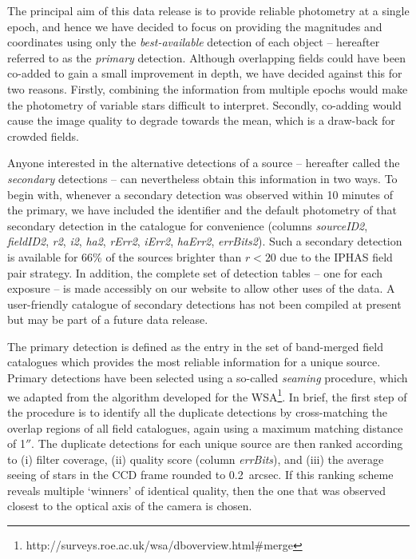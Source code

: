 \documentclass[useAMS,usenatbib]{mn2e}
\def\arcsec{$''$}
\begin{document}
The principal aim of this data release is to provide 
reliable photometry at a single epoch,
and hence we have decided
to focus on providing the magnitudes
and coordinates using only the \emph{best-available} 
detection of each object -- 
hereafter referred to as the \emph{primary} detection.
Although overlapping fields could have been co-added 
to gain a small improvement in depth, 
we have decided against this for two reasons.
Firstly, combining the information from multiple epochs
would make the photometry of variable stars difficult to interpret.
Secondly, co-adding would cause the image quality to degrade towards the mean,
which is a draw-back for crowded fields.

Anyone interested in the alternative detections of a source
-- hereafter called the \emph{secondary} detections --
can nevertheless obtain this information in two ways.
To begin with, whenever a secondary detection was observed 
within 10 minutes of the primary,
we have included the identifier and the default photometry
of that secondary detection
in the catalogue for convenience
(columns \emph{sourceID2}, \emph{fieldID2}, 
\emph{r2}, \emph{i2}, \emph{ha2},
\emph{rErr2}, \emph{iErr2}, \emph{haErr2}, \emph{errBits2}).
Such a secondary detection is available for 66\% of the sources brighter than $r<20$
due to the IPHAS field pair strategy.
In addition, the complete set of detection tables -- one for each exposure -- 
is made accessibly on our website to allow other uses of the data.
A user-friendly catalogue of secondary detections 
has not been compiled at present 
but may be part of a future data release.

The primary detection is defined as the entry in the 
set of band-merged field catalogues which provides 
the most reliable information for a unique source.
Primary detections have been selected using a so-called \emph{seaming} procedure,
which we adapted from the algorithm developed for the WSA\footnote{http://surveys.roe.ac.uk/wsa/dboverview.html\#merge}.
In brief, the first step of the procedure is to identify all the duplicate detections
by cross-matching the overlap regions of all field catalogues,
again using a maximum matching distance of 1\arcsec.
The duplicate detections for each unique source are then ranked according to
(i) filter coverage, (ii) quality score (column \emph{errBits}),
and (iii) the average seeing of stars in the CCD frame rounded to 0.2~arcsec.
If this ranking scheme reveals multiple `winners' of identical quality,
then the one that was observed closest to the optical axis of the camera is chosen.
\end{document}
